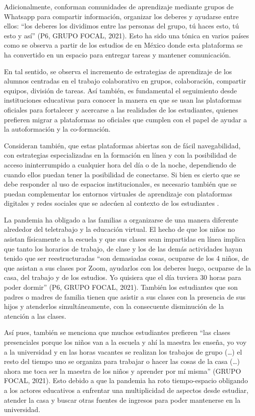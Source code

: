 \documentclass{textolivre}
\begin{document}
Adicionalmente, conforman comunidades de aprendizaje mediante grupos de Whatsapp para compartir información, organizar los deberes y ayudarse entre ellos: “los deberes los dividimos entre las personas del grupo, tú haces esto, tú esto y así” (P6, GRUPO FOCAL, 2021). Esto ha sido una tónica en varios países como se observa a partir de los estudios de \textcite{baptista_lucio_encuesta_2020} en México donde esta plataforma se ha convertido en un espacio para entregar tareas y mantener comunicación.

En tal sentido, se observa el incremento de estrategias de aprendizaje de los alumnos centradas en el trabajo colaborativo en grupos, colaboración, compartir equipos, división de tareas. Así también, es fundamental el seguimiento desde instituciones educativas para conocer la manera en que se usan las plataformas oficiales para fortalecer y acercarse a las realidades de los estudiantes, quienes prefieren migrar a plataformas no oficiales que cumplen con el papel de ayudar a la autoformación y la co-formación. 

Consideran también, que estas plataformas abiertas son de fácil navegabilidad, con estrategias especializadas en la formación en línea y con la posibilidad de acceso ininterrumpido a cualquier hora del día o de la noche, dependiendo de cuando ellos puedan tener la posibilidad de conectarse. Si bien es cierto que se debe responder al uso de espacios institucionales, es necesario también que se puedan complementar los entornos virtuales de aprendizaje con plataformas digitales y redes sociales que se adecúen al contexto de los estudiantes \cite{perez-gomez_educarse_2012}.

La pandemia ha obligado a las familias a organizarse de una manera diferente alrededor del teletrabajo y la educación virtual. El hecho de que los niños no asistan físicamente a la escuela y que sus clases sean impartidas en línea implica que tanto los horarios de trabajo, de clase y los de las demás actividades hayan tenido que ser reestructuradas “son demasiadas cosas, ocuparse de los 4 niños, de que asistan a sus clases por Zoom, ayudarlos con los deberes luego, ocuparse de la casa, del trabajo y de los estudios. Yo quisiera que el día tuviera 30 horas para poder dormir” (P6, GRUPO FOCAL, 2021). También los estudiantes que son padres o madres de familia tienen que asistir a sus clases con la presencia de sus hijos y atenderlos simultáneamente, con la consecuente disminución de la atención a las clases.

Así pues, también se menciona que muchos estudiantes prefieren “las clases presenciales porque los niños van a la escuela y ahí la maestra les enseña, yo voy a la universidad y en las horas vacantes se realizan los trabajos de grupo (…)  el resto del tiempo uno se organiza para trabajar o hacer las cosas de la casa (…) ahora me toca ser la maestra de los niños y aprender por mí misma” (GRUPO FOCAL, 2021). Esto debido a que la pandemia ha roto tiempo-espacio obligando a los actores educativos a enfrentar una multiplicidad de aspectos desde estudiar, atender la casa y buscar otras fuentes de ingresos para poder mantenerse en la universidad. 
\end{document}

